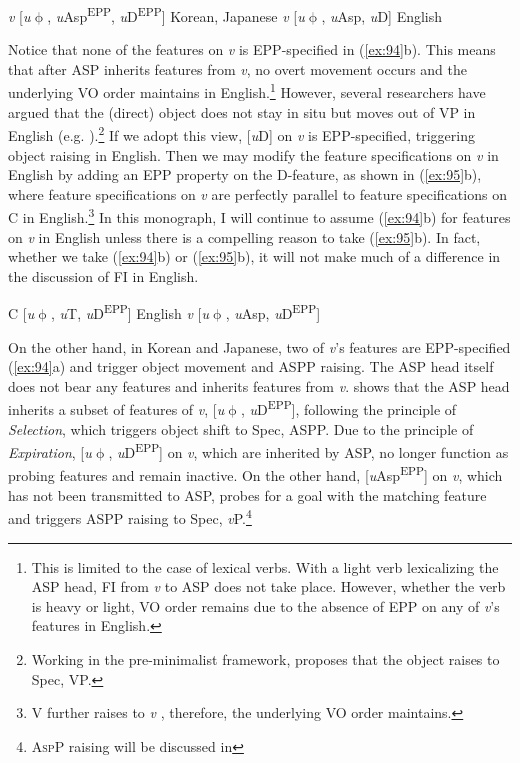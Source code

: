 \ea\label{ex:94}
    \ea  \textit{v} [\textit{u}$\upphi$, \textit{u}Asp\textsuperscript{\ac{EPP}}, \textit{u}D\textsuperscript{\ac{EPP}}]      \hfill Korean, Japanese
    \ex \textit{v} [\textit{u}$\upphi$, \textit{u}Asp, \textit{u}D]   \hfill    English
    \z
\z

Notice that none of the features on \textit{v} is \ac{EPP}-specified in (\ref{ex:94}b). This means that after \ac{ASP} inherits features from \textit{v}, no overt movement occurs and the underlying \ac{VO} order maintains in English.\footnote{This is limited to the case of lexical verbs. With a light verb lexicalizing the \ac{ASP} head, \ac{FI} from \textit{v} to \ac{ASP} does not take place. However, whether the verb is heavy or light, \ac{VO} order remains due to the absence of \ac{EPP} on any of \textit{v}'s features in English.} However, several researchers have argued that the (direct) object does not stay in situ but moves out of \ac{VP} in English (e.g. \citealt{Johnson1991,Kawakami2017,Runner1995}).\footnote{Working in the pre-minimalist framework, \citet{Johnson1991} proposes that the object raises to Spec, \ac{VP}. } If we adopt this view, [\textit{u}D] on \textit{v} is \ac{EPP}-specified, triggering object raising in English. Then we may modify the feature specifications on \textit{v} in English by adding an \ac{EPP} property on the D-feature, as shown in (\ref{ex:95}b), where feature specifications on \textit{v} are perfectly parallel to feature specifications on C in English.\footnote{\textrm{V further raises to} \textrm{\textit{v}} \textrm{\citep{Chomsky1995}, therefore, the underlying \ac{VO} order maintains.} } In this monograph, I will continue to assume (\ref{ex:94}b) for features on \textit{v} in English unless there is a compelling reason to take (\ref{ex:95}b). In fact, whether we take (\ref{ex:94}b) or (\ref{ex:95}b), it will not make much of a difference in the discussion of \ac{FI} in English.

\ea\label{ex:95}
    \ea C [\textit{u}$\upphi$, \textit{u}T, \textit{u}D\textsuperscript{\ac{EPP}}]   \hfill     English
    \ex \textit{v} [\textit{u}$\upphi$, \textit{u}Asp, \textit{u}D\textsuperscript{\ac{EPP}}]
    \z
\z

On the other hand, in Korean and Japanese, two of \textit{v}’s features are \ac{EPP}-specified (\ref{ex:94}a) and trigger object movement and \ac{ASP}P raising. The \ac{ASP} head itself does not bear any features and inherits features from \textit{v}.  shows that the \ac{ASP} head inherits a subset of features of \textit{v}, [\textit{u}$\upphi$, \textit{u}D\textsuperscript{\ac{EPP}}], following the principle of \textit{Selection}, which triggers object shift to Spec, \ac{ASP}P. Due to the principle of \textit{Expiration}, [\textit{u}$\upphi$, \textit{u}D\textsuperscript{\ac{EPP}}] on \textit{v}, which are inherited by \ac{ASP}, no longer function as probing features and remain inactive. On the other hand, [\textit{u}Asp\textsuperscript{\ac{EPP}}] on \textit{v}, which has not been transmitted to \ac{ASP}, probes for a goal with the matching feature and triggers \ac{ASP}P raising to Spec, \textit{v}P.\footnote{\textrm{A}\textrm{\textsc{sp}}\textrm{P raising will be discussed in }} 



